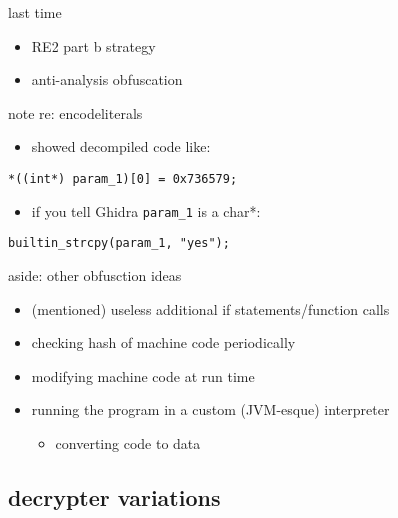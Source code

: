 \date{}
\title{}
\date{}

\begin{frame}
    \titlepage
\end{frame}

\usetikzlibrary{calc} %


\begin{frame}{last time}
    \begin{itemize}
    \item RE2 part b strategy
    \item anti-analysis obfuscation

    \end{itemize}
\end{frame}

\begin{frame}[fragile]{note re: encodeliterals}
    \begin{itemize}
    \item showed decompiled code like:
    \end{itemize}
\begin{Verbatim}[fontsize=\small]
*((int*) param_1)[0] = 0x736579;
\end{Verbatim}
    \begin{itemize}
    \item if you tell Ghidra \texttt{param\_1} is a char*:
    \end{itemize}
\begin{Verbatim}[fontsize=\small]
builtin_strcpy(param_1, "yes");
\end{Verbatim}
\end{frame}

\begin{frame}{aside: other obfusction ideas}
    \begin{itemize}
    \item (mentioned) useless additional if statements/function calls
    \item checking hash of machine code periodically
    \item modifying machine code at run time
    \item running the program in a custom (JVM-esque) interpreter
        \begin{itemize}
        \item converting code to data
        \end{itemize}
    \end{itemize}
\end{frame}

\subsection{decrypter variations}


